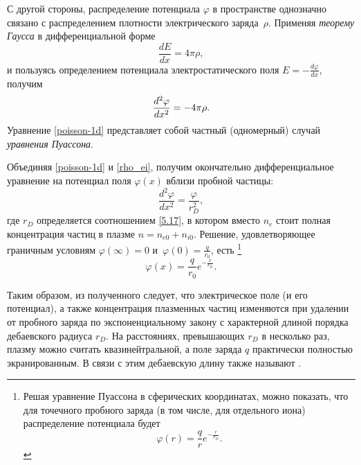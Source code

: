 С другой стороны, распределение потенциала $\varphi$ в пространстве
однозначно связано с распределением плотности электрического заряда~$\rho$.
Применяя \emph{теорему Гаусса} в дифференциальной форме
\[
\frac{dE}{dx}= 4\pi \rho,
\]
и пользуясь определением потенциала электростатического поля
$E = - \frac{d\varphi}{dx}$, получим
\begin{equation}
    \eqmark{poisson-1d}
    \frac{d^2\varphi}{dx^2} = - 4\pi \rho.
\end{equation}
Уравнение \eqref{poisson-1d} представляет собой частный (одномерный)
случай \emph{уравнения Пуассона}.

Объединяя \eqref{poisson-1d} и \eqref{rho_ei}, получим окончательно
дифференциальное уравнение на потенциал поля $\varphi(x)$ вблизи пробной частицы:
\begin{equation}
    \frac{d^2\varphi}{dx^2} = \frac{\varphi}{r_D^2},
\end{equation}
где $r_D$ определяется соотношением \eqref{5.17}, в котором вместо
$n_e$ стоит полная концентрация частиц в плазме $n=n_{e0}+n_{i0}$.
Решение, удовлетворяющее граничным условиям
$\varphi(\infty)=0$ и~$\varphi(0)=\frac{q}{r_0}$, есть%
\footnote{Решая уравнение Пуассона в сферических координатах,
можно показать, что для точечного пробного заряда
(в том числе, для отдельного иона) распределение потенциала будет
\[
\varphi(r) = \frac{q}{r} e^{-\tfrac{r}{r_D}}.
\]}
\begin{equation}
\varphi(x) = \frac{q}{r_0} e^{-\tfrac{x}{r_D}}.
\end{equation}

Таким образом, из полученного следует, что электрическое поле (и его потенциал),
а также концентрация плазменных частиц изменяются при удалении от
пробного заряда по экспоненциальному закону с характерной длиной порядка
дебаевского радиуса $r_D$. На расстояниях, превышающих $r_D$ в несколько раз,
плазму можно считать квазинейтральной, а поле заряда $q$ практически
полностью экранированным. В связи с этим дебаевскую длину также называют
.

